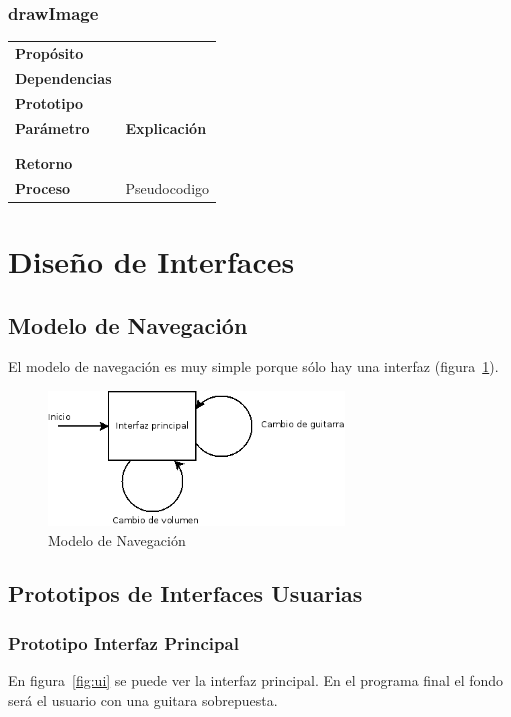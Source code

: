 \documentclass[a4paper,10pt]{article}
\begin{document}
\subsubsection{drawImage}
\begin{tabularx}{\textwidth}{p{25mm} X}
        \textbf{Propósito} & \\
        \textbf{Dependencias} & \\
        \textbf{Prototipo} & \\
        \textbf{Parámetro} & \textbf{Explicación} \\
        \begin{tabular}{p{2cm} l}
                Parámetro 1 & \\
        \end{tabular}\\
        \textbf{Retorno} & \\
        \textbf{Proceso} & Pseudocodigo \\
\end{tabularx}

\newpage

\section{Diseño de Interfaces}
\subsection{Modelo de Navegación}
El modelo de navegación es muy simple porque sólo hay una interfaz
(figura~\ref{fig:navegacion}).

\begin{figure}[hb]
        \centering
        \includegraphics[width=0.7\textwidth]{../imagenes/modelo_de_navegacion.png}
        \caption{Modelo de Navegación}
        \label{fig:navegacion}
\end{figure}
\subsection{Prototipos de Interfaces Usuarias}
\subsubsection{Prototipo Interfaz Principal}
En figura~\ref{fig:ui} se puede ver la interfaz principal. En el programa final
el fondo será el usuario con una guitara sobrepuesta.
\end{document}
